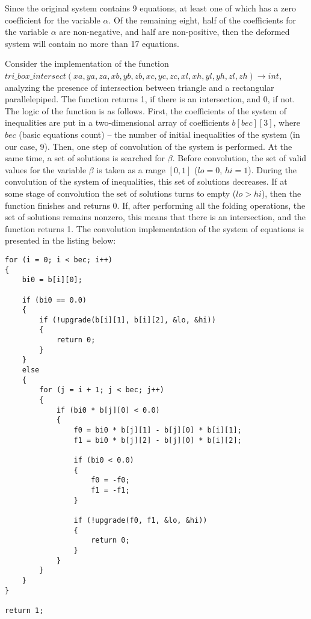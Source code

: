\documentclass[
11pt,%
tightenlines,%
twoside,%
onecolumn,%
nofloats,%
nobibnotes,%
nofootinbib,%
superscriptaddress,%
noshowpacs,%
centertags]%
{revtex4}
\begin{document}
Since the original system contains 9 equations, at least one of which has a zero coefficient for the variable $\alpha$.
Of the remaining eight, half of the coefficients for the variable $\alpha$ are non-negative, and half are non-positive, then the deformed system will contain no more than 17 equations.

Consider the implementation of the function \\
$tri\_box\_intersect(xa, ya, za, xb, yb, zb, xc, yc, zc, xl, xh, yl, yh, zl, zh) \rightarrow int$, analyzing the presence of intersection between triangle and a rectangular parallelepiped.
The function returns 1, if there is an intersection, and 0, if not.
The logic of the function is as follows.
First, the coefficients of the system of inequalities are put in a two-dimensional array of coefficients $b[bec][3]$, where $bec$ (basic equations count) -- the number of initial inequalities of the system (in our case, 9).
Then, one step of convolution of the system is performed. At the same time, a set of solutions is searched for $\beta$.
Before convolution, the set of valid values for the variable $\beta$ is taken as a range $[0, 1]$ ($lo = 0$, $hi = 1$).
During the convolution of the system of inequalities, this set of solutions decreases.
If at some stage of convolution the set of solutions turns to empty ($lo > hi$), then the function finishes and returns 0.
If, after performing all the folding operations, the set of solutions remains nonzero, this means that there is an intersection, and the function returns 1.
The convolution implementation of the system of equations is presented in the listing below:

\begin{lstlisting}[caption={The initial implementation of convolution of system of linear inequalities aimed to determine the intersection of a triangle and a rectangular parallelepiped.},label={lst:prac_intersect_1}]
for (i = 0; i < bec; i++)
{
    bi0 = b[i][0];

    if (bi0 == 0.0)
    {
        if (!upgrade(b[i][1], b[i][2], &lo, &hi))
        {
            return 0;
        }
    }
    else
    {
        for (j = i + 1; j < bec; j++)
        {
            if (bi0 * b[j][0] < 0.0)
            {
                f0 = bi0 * b[j][1] - b[j][0] * b[i][1];
                f1 = bi0 * b[j][2] - b[j][0] * b[i][2];

                if (bi0 < 0.0)
                {
                    f0 = -f0;
                    f1 = -f1;
                }

                if (!upgrade(f0, f1, &lo, &hi))
                {
                    return 0;
                }
            }
        }
    }
}

return 1;
\end{lstlisting}
\end{document}
